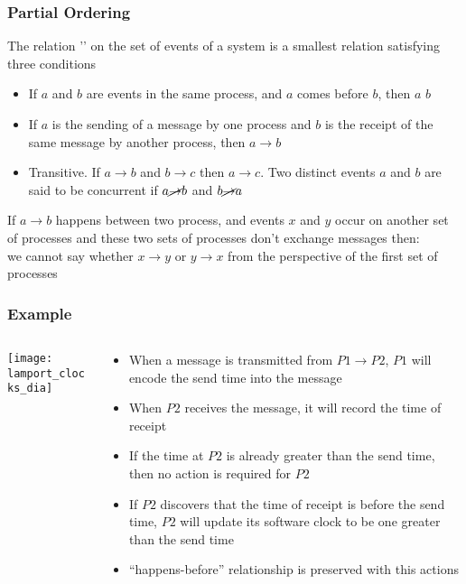 \documentclass[aspectratio=169, 15pt,usenames,dvipsnames]{beamer}
\begin{document}
{\begin{gdblank}
\begin{itemize}
		\end{itemize}		
	\end{gdblank}
	\begin{gdblank}
		\frametitle{Partial Ordering}
		The relation '\rightarrow' on the set of events of a system is a smallest relation satisfying three conditions
		\begin{itemize}
			\item If $a$ and $b$ are events in the same process, and $a$ comes before $b$, then $a$ \rightarrow $b$ 
			\item If $a$ is the sending of a message by one process and $b$ is the receipt of the same message by another process, then $a\rightarrow b$
			\item Transitive. If $a\rightarrow b$ and $b\rightarrow c$ then $a\rightarrow c$. Two distinct events $a$ and $b$ are said to be concurrent if $a\cancel{\rightarrow} b$ and $b\cancel{\rightarrow} a$
		\end{itemize}				
		\par
		If $a\rightarrow b$ happens between two process, and events $x$ and $y$ occur on another set of processes and these two sets of processes don’t exchange messages then:\\
		we cannot say whether $x\rightarrow y$ or $y\rightarrow x$ from the perspective of the first set of processes
	\end{gdblank}
	\begin{gdblank}
		\frametitle{Example}
		\begin{columns}
			\begin{column}{0.5\textwidth}
				\texttt{[image: lamport\_clocks\_dia]}			
			\end{column}
			\begin{column}{0.5\textwidth}
				\begin{itemize}
					\item When a message is transmitted from $P1 \rightarrow P2$, $P1$ will encode the send time into the message
					      \pause
					\item When $P2$ receives the message, it will record the time of receipt
					      \pause
					\item If the time at $P2$ is already greater than the send time, then no action is required for $P2$
					      \pause
					\item If $P2$ discovers that the time of receipt is before the send time, $P2$ will update its software clock to be one greater than the send time
					      \pause
					\item “happens-before” relationship is preserved with this actions

\end{itemize}
\end{column}
\end{columns}
\end{gdblank}}
\end{document}
